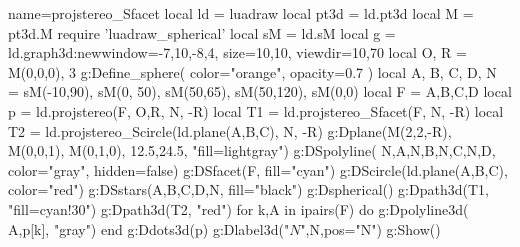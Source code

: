 \begin{luadraw}{name=projstereo_Sfacet}
local ld = luadraw
local pt3d = ld.pt3d
local M = pt3d.M
require 'luadraw_spherical'
local sM = ld.sM
local g = ld.graph3d:new{window={-7,10,-8,4}, size={10,10}, viewdir={10,70}}
local O, R = M(0,0,0), 3
g:Define_sphere( {color="orange", opacity=0.7} )
local A, B, C, D, N = sM(-10,90), sM(0, 50), sM(50,65), sM(50,120), sM(0,0)
local F = {A,B,C,D}
local p = ld.projstereo(F, {O,R}, N, -R)
local T1 = ld.projstereo_Sfacet(F, N, -R)
local T2 = ld.projstereo_Scircle(ld.plane(A,B,C), N, -R)
g:Dplane({M(2,2,-R), M(0,0,1)}, M(0,1,0), 12.5,24.5, "fill=lightgray")
g:DSpolyline( {{N,A},{N,B},{N,C},{N,D}}, {color="gray", hidden=false})
g:DSfacet(F, {fill="cyan"})
g:DScircle(ld.plane(A,B,C), {color="red"})
g:DSstars({A,B,C,D,N}, {fill="black"})
g:Dspherical()
g:Dpath3d(T1, "fill=cyan!30")
g:Dpath3d(T2, "red")
for k,A in ipairs(F) do 
    g:Dpolyline3d( {A,p[k]}, "gray")
end
g:Ddots3d(p)
g:Dlabel3d("$N$",N,{pos="N"})
g:Show()
\end{luadraw}

